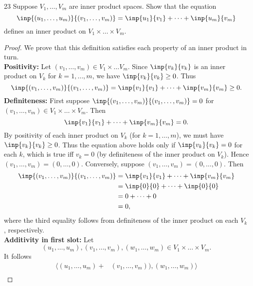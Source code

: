 \documentclass{extarticle}
\newenvironment{problem}[1]{\begin{prob*}{#1}{}}{\end{prob*}}
\begin{document}
\begin{problem}{23}
Suppose $V_1, \dots, V_m$ are inner product spaces.  Show that the equation
\begin{equation*}
\inp{(u_1,\dots, u_m)}{(v_1,\dots, v_m)} = \inp{u_1}{v_1} + \dots + \inp{u_m}{v_m}
\end{equation*}
defines an inner product on $V_1\times \dots \times V_m$. 
\end{problem}
\begin{proof}
We prove that this definition satisfies each property of an inner product in turn.\\
\textbf{Positivity: } Let $(v_1,\dots, v_m)\in V_1\times\dots V_m$.  Since $\inp{v_k}{v_k}$ is an inner product on $V_k$ for $k = 1,\dots, m$, we have $\inp{v_k}{v_k}\geq 0$.  Thus
\begin{equation*}
\inp{(v_1,\dots, v_m)}{(v_1,\dots, v_m)} = \inp{v_1}{v_1} + \dots + \inp{v_m}{v_m} \geq 0.
\end{equation*}
\textbf{Definiteness: } First suppose $\inp{(v_1,\dots, v_m)}{(v_1,\dots, v_m)} = 0$ for $(v_1,\dots, v_m)\in V_1\times\dots\times V_m$.  Then
\begin{equation*}
\inp{v_1}{v_1} + \dots + \inp{v_m}{v_m} = 0.
\end{equation*}
By positivity of each inner product on $V_k$ (for $k = 1,\dots, m$), we must have $\inp{v_k}{v_k}\geq 0$.  Thus the equation above holds only if $\inp{v_k}{v_k} = 0$ for each $k$, which is true iff $v_k = 0$ (by definiteness of the inner product on $V_k$).  Hence $(v_1, \dots, v_m) = (0, \dots, 0)$.  Conversely, suppose $(v_1,\dots, v_m) = (0, \dots, 0)$.  Then 
\begin{align*}
\inp{(v_1,\dots, v_m)}{(v_1,\dots, v_m)} &= \inp{v_1}{v_1} + \dots + \inp{v_m}{v_m}\\
&= \inp{0}{0} + \dots + \inp{0}{0}\\
&= 0 + \dots + 0\\
&= 0,
\end{align*}
where the third equality follows from definiteness of the inner product on each $V_k$, respectively.\\
\textbf{Additivity in first slot: } Let 
\begin{equation*}
(u_1,\dots, u_m), (v_1,\dots, v_m), (w_1,\dots, w_m)\in V_1\times\dots\times V_m.
\end{equation*}  
It follows
\begin{align*}
\langle (u_1, \dots, u_m) + &(v_1,\dots, v_m)), (w_1,\dots, w_m)\rangle \\

\end{align*}
\end{proof}
\end{document}
